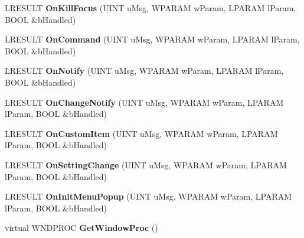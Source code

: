 \begin{DoxyCompactItemize}
\item 
\mbox{\label{class_c_def_view_a0f3ba221f0d34307f754285d8da625d0}} 
L\+R\+E\+S\+U\+LT {\bfseries On\+Kill\+Focus} (U\+I\+NT u\+Msg, W\+P\+A\+R\+AM w\+Param, L\+P\+A\+R\+AM l\+Param, B\+O\+OL \&b\+Handled)
\item 
\mbox{\label{class_c_def_view_a9fe3d5d9f7ebbfd3a225d4194cbc75f4}} 
L\+R\+E\+S\+U\+LT {\bfseries On\+Command} (U\+I\+NT u\+Msg, W\+P\+A\+R\+AM w\+Param, L\+P\+A\+R\+AM l\+Param, B\+O\+OL \&b\+Handled)
\item 
\mbox{\label{class_c_def_view_af4786312760bcf747e0d2493f0f602a0}} 
L\+R\+E\+S\+U\+LT {\bfseries On\+Notify} (U\+I\+NT u\+Msg, W\+P\+A\+R\+AM w\+Param, L\+P\+A\+R\+AM l\+Param, B\+O\+OL \&b\+Handled)
\item 
\mbox{\label{class_c_def_view_ae6076cc4d97a31ed5aec9a881718361c}} 
L\+R\+E\+S\+U\+LT {\bfseries On\+Change\+Notify} (U\+I\+NT u\+Msg, W\+P\+A\+R\+AM w\+Param, L\+P\+A\+R\+AM l\+Param, B\+O\+OL \&b\+Handled)
\item 
\mbox{\label{class_c_def_view_a740a9164cc9d353f468557edc01cb49d}} 
L\+R\+E\+S\+U\+LT {\bfseries On\+Custom\+Item} (U\+I\+NT u\+Msg, W\+P\+A\+R\+AM w\+Param, L\+P\+A\+R\+AM l\+Param, B\+O\+OL \&b\+Handled)
\item 
\mbox{\label{class_c_def_view_a65da0852b8358710c25ca21f798237d4}} 
L\+R\+E\+S\+U\+LT {\bfseries On\+Setting\+Change} (U\+I\+NT u\+Msg, W\+P\+A\+R\+AM w\+Param, L\+P\+A\+R\+AM l\+Param, B\+O\+OL \&b\+Handled)
\item 
\mbox{\label{class_c_def_view_a5d0e36b525dcf735ca23b393e8774ee9}} 
L\+R\+E\+S\+U\+LT {\bfseries On\+Init\+Menu\+Popup} (U\+I\+NT u\+Msg, W\+P\+A\+R\+AM w\+Param, L\+P\+A\+R\+AM l\+Param, B\+O\+OL \&b\+Handled)
\item 
\mbox{\label{class_c_def_view_a6fcbb52b046991850094febbd9ccea29}} 
virtual W\+N\+D\+P\+R\+OC {\bfseries Get\+Window\+Proc} ()
\end{DoxyCompactItemize}
